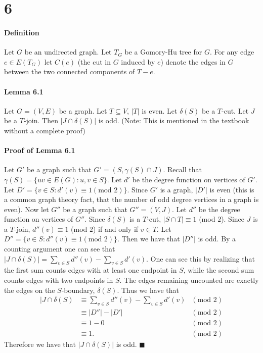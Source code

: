 \documentclass[letterpaper,12pt,oneside,onecolumn]{article}
\begin{document}
\section*{6}
\paragraph{Definition}
Let $G$ be an undirected graph. Let $T_G$ be a Gomory-Hu tree for $G$.  For any edge $e \in E(T_G)$ let $C(e)$ (the cut in $G$ induced by $e$) denote the edges in $G$ between the two connected components of $T-e$.
\paragraph{Lemma 6.1}
Let $G=(V,E)$ be a graph. Let $T \subseteq V$, $|T|$ is even. Let $\delta(S)$ be a $T$-cut. Let $J$ be a $T$-join. Then $|J \cap \delta(S)|$ is odd. (Note: This is mentioned in the textbook without a complete proof)
\paragraph{Proof of Lemma 6.1}
Let $G'$ be a graph such that $G' = (S, \gamma(S) \cap J)$. Recall that $\gamma(S) = \{ uv \in E(G) : u, v \in S\}$. Let $d'$ be the degree function on vertices of $G'$. Let $D' = \{ v \in S : d'(v) \equiv 1 (\text{mod }2)\}$. Since $G'$ is a graph, $|D'|$ is even (this is a common graph theory fact, that the number of odd degree vertices in a graph is even). Now let $G''$ be a graph such that $G'' = (V, J)$. Let $d''$ be the degree function on vertices of $G''$. Since $\delta(S)$ is a $T$-cut, $|S \cap T| \equiv 1$ (mod $2$). Since $J$ is a $T$-join, $d''(v) \equiv 1$ (mod $2$) if and only if $v \in T$. Let $D'' = \{v \in S : d''(v) \equiv 1 (\text{mod }2)\}$. Then we have that $|D''|$ is odd. By a counting argument one can see that $|J \cap \delta(S)| = \sum_{v \in S} d''(v) - \sum_{v \in S} d'(v)$. One can see this by realizing that the first sum counts edges with at least one endpoint in $S$, while the second sum counts edges with two endpoints in $S$. The edges remaining uncounted are exactly the edges on the $S$-boundary, $\delta(S)$. Thus we have that
\begin{align*}
|J \cap \delta(S) &\equiv \sum_{v \in S} d''(v) - \sum_{v \in S} d'(v) &(\text{mod }2)\\
&\equiv |D''| - |D'| &(\text{mod }2)\\
&\equiv 1 - 0 &(\text{mod }2)\\
&\equiv 1. &(\text{mod }2)
\end{align*}
Therefore we have that $|J \cap \delta(S)|$ is odd. $\blacksquare$
\end{document}
